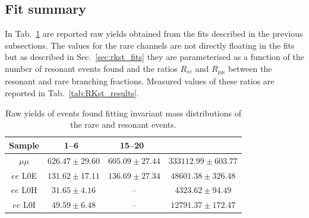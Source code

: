 \subsection{Fit summary}

In Tab.~\ref{tab:RKst_yields} are reported raw yields obtained from the
fits described in the previous subsections. The values for the rare channels are not
directly floating in the fits but as described in Sec.~\ref{sec:rkst_fits} they are parameterised
as a function of the number of resonant events found and the ratios $R_{ee}$ and $R_{\mu\mu}$
between the resonant and rare branching fractions. Measured values of these ratios are reported 
in Tab.~\ref{tab:RKst_results}.

\begin{table}
\centering
\begin{tabular}{|c|c|c|c|}
\hline
 Sample 			& 1--6~\gevgevcccc 			& 15--20~\gevgevcccc 		& \jpsi  \\ \hline
$\mu\mu$ 		& $ 626.47  \pm 29.60  $ 		& $ 605.09  \pm 27.44 $ 		& $ 333112.99  \pm 603.77 $ \\
$ee$ L0E 			& $ 131.62   \pm  17.11$   	& $ 136.69  \pm 27.34 $ 		& $ 48601.38  \pm 326.48 $ \\
$ee$ L0H 			& $ 31.65   \pm  4.16$ 		& 			-- 			& $ 4323.62  \pm 94.49 $ \\
$ee$ L0I 			& $ 49.59   \pm  6.48$ 		& 			-- 			& $ 12791.37  \pm 172.47 $ \\
\hline
 \end{tabular}
\caption{Raw yields of events found fitting invariant mass distributions of the rare and resonant events. }
\label{tab:RKst_yields}
\end{table}


\clearpage

